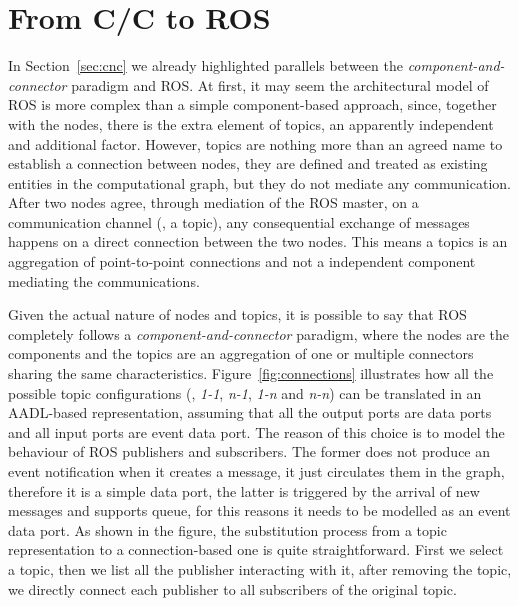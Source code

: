 \section{From C/C to ROS}
\label{sec:cnc-ros}
In Section~\ref{sec:cnc} we already highlighted parallels between the \textit{component-and-connector} paradigm and ROS. At first, it may seem the architectural model of ROS is more complex than a simple component-based approach, since, together with the nodes, there is the extra element of topics, an apparently independent and additional factor. However, topics are nothing more than an agreed name to establish a connection between nodes, they are defined and treated as existing entities in the computational graph, but they do not mediate any communication. After two nodes agree, through mediation of the ROS master, on a communication channel (\ie, a topic), any consequential exchange of messages happens on a direct connection between the two nodes. This means a topics is an aggregation of point-to-point connections and not a independent component mediating the communications. 

Given the actual nature of nodes and topics, it is possible to say that ROS completely follows a \textit{component-and-connector} paradigm, where the nodes are the components and the topics are an aggregation of one or multiple connectors sharing the same characteristics. Figure~\ref{fig:connections} illustrates how all the possible topic configurations (\ie, \textit{1-1}, \textit{n-1}, \textit{1-n} and \textit{n-n}) can be translated in an AADL-based representation, assuming that all the output ports are data ports and all input ports are event data port. The reason of this choice is to model the behaviour of ROS publishers and subscribers. The former does not produce an event notification when it creates a message, it just circulates them in the graph, therefore it is a simple data port, the latter is triggered by the arrival of new messages and supports queue, for this reasons it needs to be modelled as an event data port. As shown in the figure, the substitution process from a topic representation to a connection-based one is quite straightforward. First we select a topic, then we list all the publisher interacting with it, after removing the topic, we directly connect each publisher to all subscribers of the original topic. 

